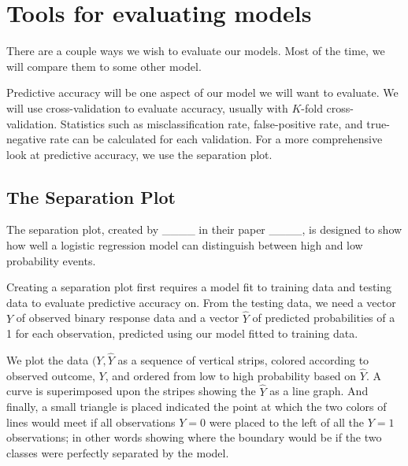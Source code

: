 \documentclass[12pt,twoside]{reedthesis}
\begin{document}
  \section{Tools for evaluating models}\label{tools-for-evaluating-models}
  
  There are a couple ways we wish to evaluate our models. Most of the
  time, we will compare them to some other model.
  
  Predictive accuracy will be one aspect of our model we will want to
  evaluate. We will use cross-validation to evaluate accuracy, usually
  with \(K\)-fold cross-validation. Statistics such as misclassification
  rate, false-positive rate, and true-negative rate can be calculated for
  each validation. For a more comprehensive look at predictive accuracy,
  we use the separation plot.
  
  \subsection{The Separation Plot}\label{the-separation-plot}
  
  The separation plot, created by \_\_\_\_ in their paper \_\_\_\_, is
  designed to show how well a logistic regression model can distinguish
  between high and low probability events.
  
  Creating a separation plot first requires a model fit to training data
  and testing data to evaluate predictive accuracy on. From the testing
  data, we need a vector \(Y\) of observed binary response data and a
  vector \(\hat{Y}\) of predicted probabilities of a 1 for each
  observation, predicted using our model fitted to training data.
  
  We plot the data \((Y, \hat{Y}\) as a sequence of vertical strips,
  colored according to observed outcome, \(Y\), and ordered from low to
  high probability based on \(\hat{Y}\). A curve is superimposed upon the
  stripes showing the \(\hat{Y}\) as a line graph. And finally, a small
  triangle is placed indicated the point at which the two colors of lines
  would meet if all observations \(Y = 0\) were placed to the left of all
  the \(Y=1\) observations; in other words showing where the boundary
  would be if the two classes were perfectly separated by the model.
  
\end{document}
